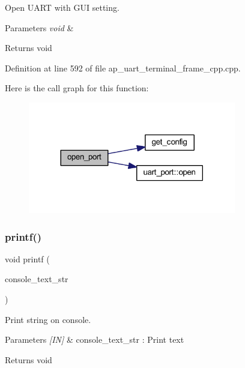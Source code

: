 Open U\+A\+RT with G\+UI setting. 


\begin{DoxyParams}{Parameters}
{\em void} & \\
\hline
\end{DoxyParams}
\begin{DoxyReturn}{Returns}
void 
\end{DoxyReturn}


Definition at line 592 of file ap\+\_\+uart\+\_\+terminal\+\_\+frame\+\_\+cpp.\+cpp.

Here is the call graph for this function\+:\nopagebreak
\begin{figure}[H]
\begin{center}
\leavevmode
\includegraphics[width=257pt]{group___u_a_r_t__terminal_gaeb58113a5a9df68000116b815e75ef76_cgraph}
\end{center}
\end{figure}
\mbox{\label{group___u_a_r_t__terminal_ga567b6dc058e91d1c6521c34673d67b7f}} 
\subsubsection{printf()}
{\footnotesize\ttfamily void printf (\begin{DoxyParamCaption}\item[{wx\+String}]{console\+\_\+text\+\_\+str }\end{DoxyParamCaption})}



Print string on console. 


\begin{DoxyParams}{Parameters}
{\em \mbox{[}\+I\+N\mbox{]}} & console\+\_\+text\+\_\+str \+: Print text \\
\hline
\end{DoxyParams}
\begin{DoxyReturn}{Returns}
void 
\end{DoxyReturn}


